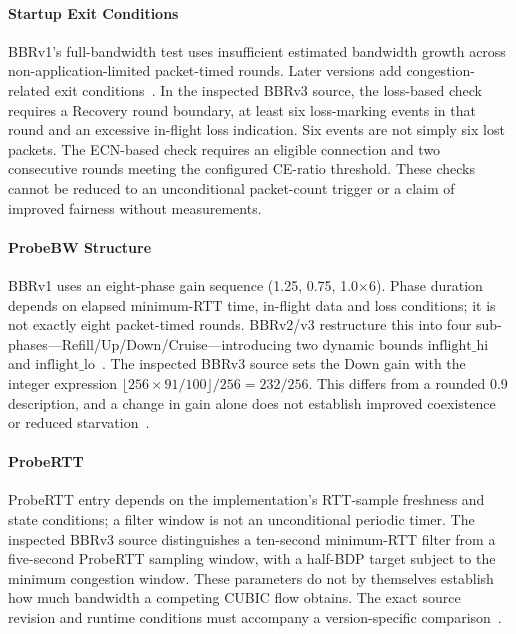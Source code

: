 \documentclass[a4paper,fleqn]{cas-sc}
\begin{document}
\paragraph{Startup Exit Conditions}
BBRv1's full-bandwidth test uses insufficient estimated bandwidth growth
across non-application-limited packet-timed rounds. Later versions add
congestion-related exit conditions~\citep{cardwell2019bbrv2,cardwell2023bbrv3}.
In the inspected BBRv3 source, the loss-based check requires a Recovery
round boundary, at least six loss-marking events in that round and an
excessive in-flight loss indication. Six events are not simply six lost
packets. The ECN-based check requires an eligible connection and two
consecutive rounds meeting the configured CE-ratio threshold. These checks
cannot be reduced to an unconditional packet-count trigger or a claim of
improved fairness without measurements.

\paragraph{ProbeBW Structure}
BBRv1 uses an eight-phase gain sequence (1.25, 0.75, 1.0$\times$6).
Phase duration depends on elapsed minimum-RTT time, in-flight data and loss
conditions; it is not exactly eight packet-timed rounds. BBRv2/v3 restructure this into four sub-phases---Refill/Up/Down/Cruise---introducing
two dynamic bounds $\mathrm{inflight\_hi}$ and
$\mathrm{inflight\_lo}$~\citep{cardwell2019bbrv2}. The inspected BBRv3 source sets the Down gain with the integer expression
$\lfloor256\times91/100\rfloor/256=232/256$. This differs from a rounded
0.9 description, and a change in gain alone does not establish improved
coexistence or reduced starvation~\citep{cardwell2023bbrv3}.

\paragraph{ProbeRTT}
ProbeRTT entry depends on the implementation's RTT-sample freshness and
state conditions; a filter window is not an unconditional periodic timer.
The inspected BBRv3 source distinguishes a ten-second minimum-RTT filter
from a five-second ProbeRTT sampling window, with a half-BDP target
subject to the minimum congestion window. These parameters do not by
themselves establish how much bandwidth a competing CUBIC flow obtains.
The exact source revision and runtime conditions must accompany a
version-specific comparison~\citep{cardwell2019bbrv2,cardwell2023bbrv3}.
\end{document}
